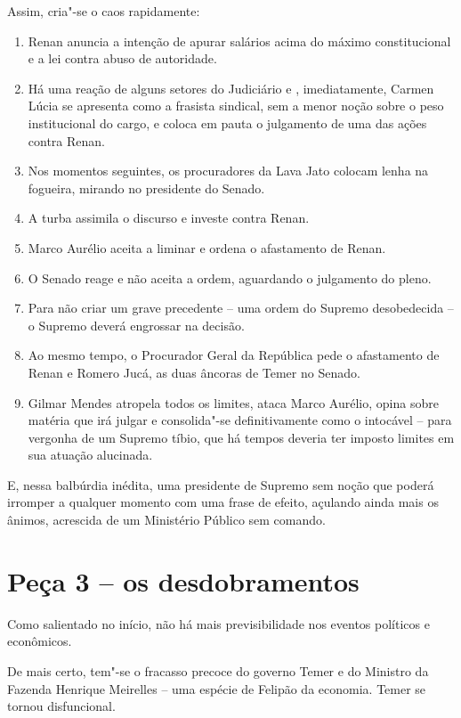 Assim, cria"-se o caos rapidamente:

\begin{enumerate}
\itemsep1pt\parskip0pt
\item
  Renan anuncia a intenção de apurar salários acima do máximo
  constitucional e a lei contra abuso de autoridade.
\item
  Há uma reação de alguns setores do Judiciário e , imediatamente,
  Carmen Lúcia se apresenta como a frasista sindical, sem a menor noção
  sobre o peso institucional do cargo, e coloca em pauta o julgamento de
  uma das ações contra Renan.
\item
  Nos momentos seguintes, os procuradores da Lava Jato colocam lenha na
  fogueira, mirando no presidente do Senado.
\item
  A turba assimila o discurso e investe contra Renan.
\item
  Marco Aurélio aceita a liminar e ordena o afastamento de Renan.
\item
  O Senado reage e não aceita a ordem, aguardando o julgamento do pleno.
\item
  Para não criar um grave precedente -- uma ordem do Supremo
  desobedecida --o Supremo deverá engrossar na decisão.
\item
  Ao mesmo tempo, o Procurador Geral da República pede o afastamento de
  Renan e Romero Jucá, as duas âncoras de Temer no Senado.
\item
  Gilmar Mendes atropela todos os limites, ataca Marco Aurélio, opina
  sobre matéria que irá julgar e consolida"-se definitivamente como o
  intocável -- para vergonha de um Supremo tíbio, que há tempos deveria
  ter imposto limites em sua atuação alucinada.
\end{enumerate}

E, nessa balbúrdia inédita, uma presidente de Supremo sem noção que
poderá irromper a qualquer momento com uma frase de efeito, açulando
ainda mais os ânimos, acrescida de um Ministério Público sem comando.

\section{Peça 3 -- os desdobramentos}

Como salientado no início, não há mais previsibilidade nos eventos
políticos e econômicos.

De mais certo, tem"-se o fracasso precoce do governo Temer e do Ministro
da Fazenda Henrique Meirelles -- uma espécie de Felipão da economia.
Temer se tornou disfuncional.

